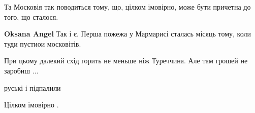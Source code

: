 \begin{itemize}
Та Московія так поводиться тому, що, цілком імовірно, може бути причетна до того, що сталося.

\begin{itemize}
 
\textbf{Oksana Angel} Так і є. Перша пожежа у Мармарисі сталась місяць тому, коли туди пустиои московітів.
\end{itemize}

 
При цьому далекий схід горить не меньше ніж Туреччина. Але там грошей не заробиш ...

 
руські і підпалили

\begin{itemize}
 
Цілком імовірно .
\end{itemize}

\end{itemize}

